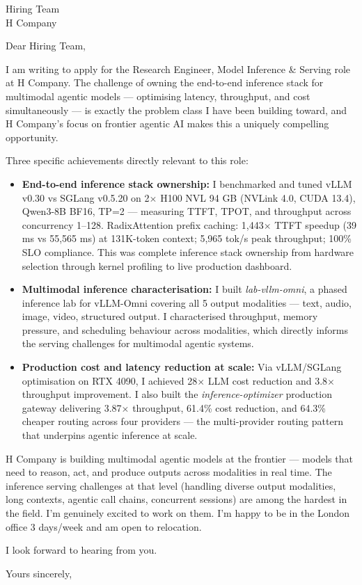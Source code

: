 \documentclass[a4paper]{letter}
\date{\today}
\begin{document}
\begin{letter}{Hiring Team \\ H Company}

\opening{Dear Hiring Team,}

I am writing to apply for the Research Engineer, Model Inference \& Serving role at H Company. The challenge of owning the end-to-end inference stack for multimodal agentic models — optimising latency, throughput, and cost simultaneously — is exactly the problem class I have been building toward, and H Company's focus on frontier agentic AI makes this a uniquely compelling opportunity.

Three specific achievements directly relevant to this role:

\begin{itemize}
  \item \textbf{End-to-end inference stack ownership:} I benchmarked and tuned vLLM v0.30 vs SGLang v0.5.20 on 2$\times$ H100 NVL 94 GB (NVLink 4.0, CUDA 13.4), Qwen3-8B BF16, TP=2 — measuring TTFT, TPOT, and throughput across concurrency 1--128. RadixAttention prefix caching: 1,443$\times$ TTFT speedup (39 ms vs 55,565 ms) at 131K-token context; 5,965 tok/s peak throughput; 100\% SLO compliance. This was complete inference stack ownership from hardware selection through kernel profiling to live production dashboard.
  \item \textbf{Multimodal inference characterisation:} I built \textit{lab-vllm-omni}, a phased inference lab for vLLM-Omni covering all 5 output modalities — text, audio, image, video, structured output. I characterised throughput, memory pressure, and scheduling behaviour across modalities, which directly informs the serving challenges for multimodal agentic systems.
  \item \textbf{Production cost and latency reduction at scale:} Via vLLM/SGLang optimisation on RTX 4090, I achieved 28$\times$ LLM cost reduction and 3.8$\times$ throughput improvement. I also built the \textit{inference-optimizer} production gateway delivering 3.87$\times$ throughput, 61.4\% cost reduction, and 64.3\% cheaper routing across four providers — the multi-provider routing pattern that underpins agentic inference at scale.
\end{itemize}

H Company is building multimodal agentic models at the frontier — models that need to reason, act, and produce outputs across modalities in real time. The inference serving challenges at that level (handling diverse output modalities, long contexts, agentic call chains, concurrent sessions) are among the hardest in the field. I'm genuinely excited to work on them. I'm happy to be in the London office 3 days/week and am open to relocation.

I look forward to hearing from you.

\closing{Yours sincerely,}

\end{letter}
\end{document}
